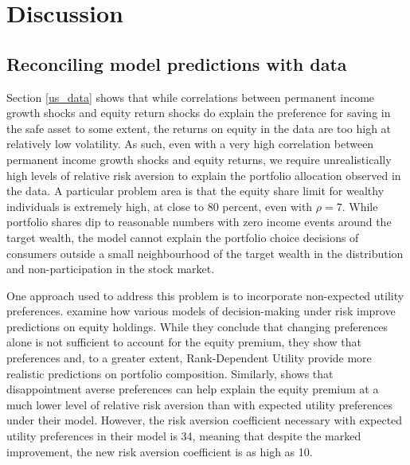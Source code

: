 \section{Discussion}\label{discussion}

\subsection{Reconciling model predictions with data}\label{reconciliation}

Section \ref{us_data} shows that while correlations between permanent income growth shocks and equity return shocks do explain the preference for saving in the safe asset to some extent, the returns on equity in the data are too high at relatively low volatility. As such, even with a very high correlation between permanent income growth shocks and equity returns, we require unrealistically high levels of relative risk aversion to explain the portfolio allocation observed in the data. A particular problem area is that the equity share limit for wealthy individuals is extremely high, at close to 80 percent, even with $\rho = 7$. While portfolio shares dip to reasonable numbers with zero income events around the target wealth, the model cannot explain the portfolio choice decisions of consumers outside a small neighbourhood of the target wealth in the distribution and non-participation in the stock market.

One approach used to address this problem is to incorporate non-expected utility preferences. \citet{Haliassos2001} examine how various models of decision-making under risk improve predictions on equity holdings. While they conclude that changing preferences alone is not sufficient to account for the equity premium, they show that \citet{Kreps1978} preferences and, to a greater extent, Rank-Dependent Utility \citep{Quiggin1982} provide more realistic predictions on portfolio composition. Similarly, \citet{Schreindorfer2020} shows that disappointment averse preferences \autocite{Gul1991, Routledge2010} can help explain the equity premium at a much lower level of relative risk aversion than with expected utility preferences under their model. However, the risk aversion coefficient necessary with expected utility preferences in their model is 34, meaning that despite the marked improvement, the new risk aversion coefficient is as high as 10.

